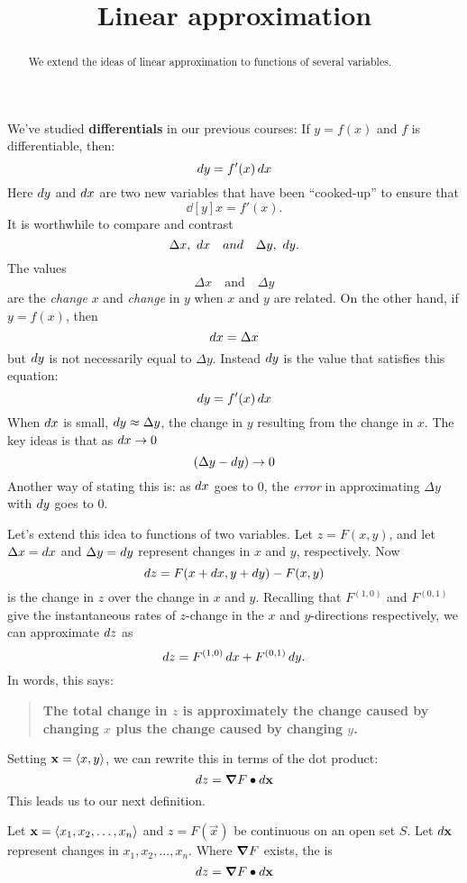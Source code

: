 \documentclass{ximera}
\title[Dig-In:]{Linear approximation}
\begin{document}
\begin{abstract}
  We extend the ideas of linear approximation to functions of several
  variables.
\end{abstract}
\maketitle


We've studied \textbf{differentials} in our previous courses: If
$y=f(x)$ and $f$ is differentiable, then:
\[
\mathop{}\!d y=f'(x)\mathop{}\!d x
\]
Here $\mathop{}\!d y$ and $\mathop{}\!d x$ are two new variables that have been
``cooked-up'' to ensure that
\[
\dd[y]{x} = f'(x).
\]
It is worthwhile to compare and contrast
\[
\Delta x, \ \mathop{}\!d x \quad{and}\quad \Delta y,\  \mathop{}\!d y.
\]
The values
\[
\Delta x \quad\text{and}\quad \Delta y
\]
are the \textit{change} $x$ and \textit{change} in $y$ when $x$ and
$y$ are related. On the other hand, if $y=f(x)$, then
\[
\mathop{}\!d x = \Delta x
\]
but $\mathop{}\!d y$ is not necessarily equal to $\Delta y$. Instead $\mathop{}\!d y$ is
the value that satisfies this equation:
\[
\mathop{}\!d y=f'(x)\mathop{}\!d x
\]
When $\mathop{}\!d x$ is small, $\mathop{}\!d y\approx \Delta y$, the change in $y$
resulting from the change in $x$. The key ideas is that as $\mathop{}\!d x\to 0$
\[
(\Delta y - \mathop{}\!d y) \to 0
\]
Another way of stating this is: as $\mathop{}\!d x$ goes to $0$, the \textit{error}
in approximating $\Delta y$ with $\mathop{}\!d y$ goes to $0$.


Let's extend this idea to functions of two variables. Let $z=F(x,y)$,
and let $\Delta x = \mathop{}\!d x$ and $\Delta y=\mathop{}\!d y$ represent changes in $x$
and $y$, respectively. Now
\[
\mathop{}\!d z = F(x+\mathop{}\!d x,y+\mathop{}\!d y) - F(x,y)
\]
is the change in $z$ over the change in $x$ and $y$. Recalling that
$F^{(1,0)}$ and $F^{(0,1)}$ give the instantaneous rates of $z$-change
in the $x$ and $y$-directions respectively, we can approximate $\mathop{}\!d z$ as
\[
\mathop{}\!d z = F^{(1,0)}\mathop{}\!d x+F^{(0,1)}\mathop{}\!d y.
\]
In words, this says:
\begin{quote}
  \textbf{The total change in $z$ is approximately the change caused
    by changing $x$ plus the change caused by changing $y$.}
\end{quote}
Setting $\mathbf{x}=\left\langle x,y\right\rangle$, we can rewrite this in terms of the
dot product:
\[
\mathop{}\!d z = \boldsymbol\nabla F \bullet \mathop{}\!d \mathbf{x}
\]
This leads us to our next definition.
\begin{definition}
  Let $\mathbf{x} = \left\langle x_1,x_2,\dots,x_n\right\rangle$ and $z=F(\vec{x})$ be
  continuous on an open set $S$. Let $\mathop{}\!d \mathbf{x}$ represent changes in
  $x_1,x_2,\dots,x_n$. Where $\boldsymbol\nabla F$ exists, the  is
  \[
  \mathop{}\!d z  = \boldsymbol\nabla F \bullet \mathop{}\!d \mathbf{x}
  \]
\end{definition}
\end{document}
